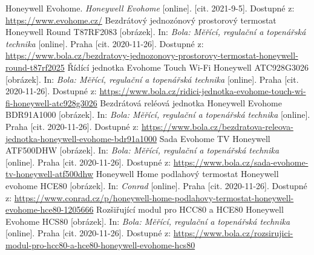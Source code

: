 \begin{thebibliography}{3}
Honeywell Evohome. \textit{Honeywell Evohome} [online]. [cit. 2021-9-5]. Dostupné z: \url{https://www.evohome.cz/}
Bezdrátový jednozónový prostorový termostat Honeywell Round T87RF2083 [obrázek]. In: \textit{Bola: Měřící, regulační a topenářská technika} [online]. Praha [cit. 2020-11-26]. Dostupné z: \url{https://www.bola.cz/bezdratovy-jednozonovy-prostorovy-termostat-honeywell-round-t87rf2025}
Řídící jednotka Evohome Touch Wi-Fi Honeywell ATC928G3026 [obrázek]. In: \textit{Bola: Měřící, regulační a topenářská technika} [online]. Praha [cit. 2020-11-26]. Dostupné z: \url{https://www.bola.cz/ridici-jednotka-evohome-touch-wi-fi-honeywell-atc928g3026}
Bezdrátová reléová jednotka Honeywell Evohome BDR91A1000 [obrázek]. In: \textit{Bola: Měřící, regulační a topenářská technika} [online]. Praha [cit. 2020-11-26]. Dostupné z: \url{https://www.bola.cz/bezdratova-releova-jednotka-honeywell-evohome-bdr91a1000}
Sada Evohome TV Honeywell ATF500DHW [obrázek]. In: \textit{Bola: Měřící, regulační a topenářská technika} [online]. Praha [cit. 2020-11-26]. Dostupné z: \url{https://www.bola.cz/sada-evohome-tv-honeywell-atf500dhw}
Honeywell Home podlahový termostat Honeywell evohome HCE80 [obrázek]. In: \textit{Conrad} [online]. Praha [cit. 2020-11-26]. Dostupné z: \url{https://www.conrad.cz/p/honeywell-home-podlahovy-termostat-honeywell-evohome-hce80-1205666}
Rozšiřující modul pro HCC80 a HCE80 Honeywell Evohome HCS80 [obrázek]. In: \textit{Bola: Měřící, regulační a topenářská technika} [online]. Praha [cit. 2020-11-26]. Dostupné z: \url{https://www.bola.cz/rozsirujici-modul-pro-hcc80-a-hce80-honeywell-evohome-hcs80}


\end{thebibliography}
